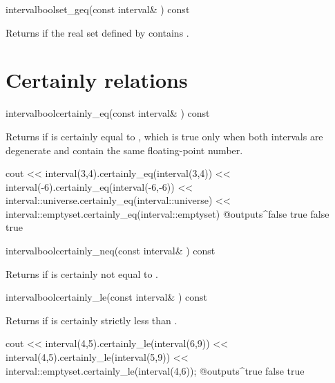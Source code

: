 \documentclass{manual}
\let\leq=\leqslant
\let\geq=\geqslant
\begin{document}
\begin{defmethod}{interval}{bool}{set\_geq}{(const interval\& ) const}
  \begin{operation}
    \op{$\forall x \in \code{self}, \exists y\in I\colon x\geq y \wedge
      \forall y\in I, \exists x \in \code{self}\colon y\leq x$}
  \end{operation}
Returns  if the real set defined by  contains .
\end{defmethod}


\section{Certainly relations}

\begin{defmethod}{interval}{bool}{certainly\_eq}{(const interval\& ) const}
  \begin{operation}
  \end{operation}
  Returns  if  is certainly equal to , which is true
only when both intervals are degenerate and contain the same floating-point number.
\begin{example}
cout << interval(3,4).certainly_eq(interval(3,4))
     << interval(-6).certainly_eq(interval(-6,-6))
     << interval::universe.certainly_eq(interval::universe)
     << interval::emptyset.certainly_eq(interval::emptyset)
@outputs^false true false true~
\end{example}
\end{defmethod}

\begin{defmethod}{interval}{bool}{certainly\_neq}{(const interval\& ) const}
  \begin{operation}
  \end{operation}
Returns  if  is certainly not equal to .
\end{defmethod}

\begin{defmethod}{interval}{bool}{certainly\_le}{(const interval\& ) const}
  \begin{operation}
  \end{operation}
  Returns  if  is certainly strictly less than .
  \begin{example}
cout << interval(4,5).certainly_le(interval(6,9))
     << interval(4,5).certainly_le(interval(5,9))
     << interval::emptyset.certainly_le(interval(4,6));
@outputs^true false true~
  \end{example}
\end{defmethod}
\end{document}
